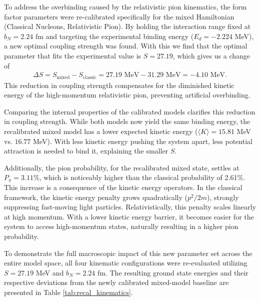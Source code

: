 \documentclass[a4paper,oneside,article,12pt]{memoir}
\begin{document}
To address the overbinding caused by the relativistic pion kinematics, the form factor parameters were re-calibrated specifically for the mixed Hamiltonian (Classical Nucleons, Relativistic Pion). By holding the interaction range fixed at $b_N = 2.24$ fm and targeting the experimental binding energy ($E_d = -2.224$ MeV), a new optimal coupling strength was found. With this we find that the optimal parameter that fits the experimental value is $S=27.19$, which gives us a change of 
\begin{align}
    \Delta S = S_{\text{mixed}} - S_{\text{classic}} = 27.19 \text{ MeV} - 31.29 \text{ MeV} = -4.10 \text{ MeV}.
\end{align}
This reduction in coupling strength compensates for the diminished kinetic energy of the high-momentum relativistic pion, preventing artificial overbinding.

Comparing the internal properties of the calibrated models clarifies this reduction in coupling strength. While both models now yield the same binding energy, the recalibrated mixed model has a lower expected kinetic energy ($\langle K \rangle = 15.81$ MeV vs. $16.77$ MeV). With less kinetic energy pushing the system apart, less potential attraction is needed to bind it, explaining the smaller $S$. 

Additionally, the pion probability, for the recalibrated mixed state, settles at $P_\pi = 3.11\%$, which is noticeably higher than the classical probability of 2.61\%. This increase is a consequence of the kinetic energy operators. In the classical framework, the kinetic energy penalty grows quadratically ($p^2/2m$), strongly suppressing fast-moving light particles. Relativistically, this penalty scales linearly at high momentum. With a lower kinetic energy barrier, it becomes easier for the system to access high-momentum states, naturally resulting in a higher pion probability.


To demonstrate the full macroscopic impact of this new parameter set across the entire model space, all four kinematic configurations were re-evaluated utilizing $S = 27.19$ MeV and $b_N = 2.24$ fm. The resulting ground state energies and their respective deviations from the newly calibrated mixed-model baseline are presented in Table \ref{tab:recal_kinematics}.
\end{document}
